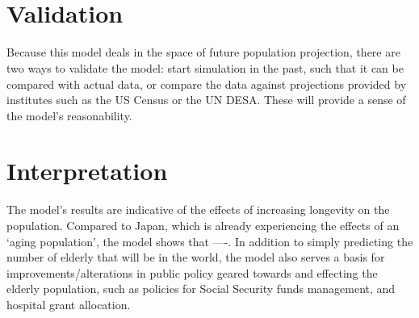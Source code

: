 \documentclass[11pt]{article}
\begin{document}
    \begin{center}
    \end{center}
    { \hspace*{\fill} \\}
    
    \begin{center}
    \end{center}
    { \hspace*{\fill} \\}
    
    \hypertarget{validation}{%
\section{Validation}\label{validation}}

    Because this model deals in the space of future population projection,
there are two ways to validate the model: start simulation in the past,
such that it can be compared with actual data, or compare the data
against projections provided by institutes such as the US Census or the
UN DESA. These will provide a sense of the model's reasonability.

    \hypertarget{interpretation}{%
\section{Interpretation}\label{interpretation}}

    The model's results are indicative of the effects of increasing
longevity on the population. Compared to Japan, which is already
experiencing the effects of an `aging population', the model shows that
----. In addition to simply predicting the number of elderly that will
be in the world, the model also serves a basis for
improvements/alterations in public policy geared towards and effecting
the elderly population, such as policies for Social Security funds
management, and hospital grant allocation.


    
    
    
    
\end{document}
